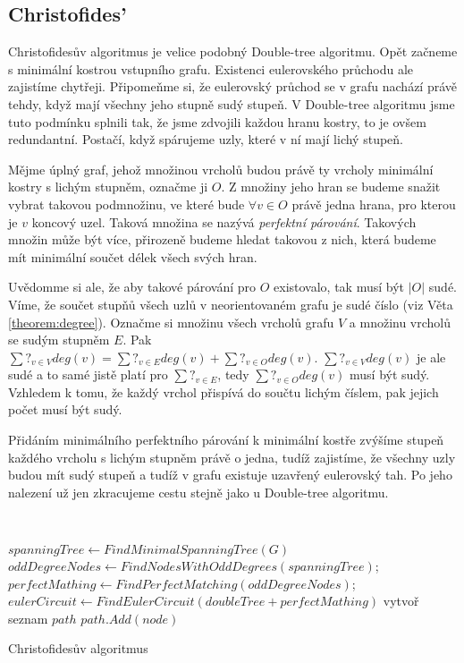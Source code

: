 \documentclass[
  biblatex,
  figures=false,
  glossaries,
  index
]{kidiplom}
\begin{document}
\begin{example}
\end{example}

\subsection{Christofides'}
Christofidesův algoritmus je velice podobný Double-tree algoritmu. Opět začneme s minimální kostrou vstupního grafu. Existenci eulerovského průchodu ale zajistíme chytřeji. Připomeňme si, že eulerovský průchod se v grafu nachází právě tehdy, když mají všechny jeho stupně sudý stupeň. V Double-tree algoritmu jsme tuto podmínku splnili tak, že jsme zdvojili každou hranu kostry, to je ovšem redundantní. Postačí, když spárujeme uzly, které v ní mají lichý stupeň.

Mějme úplný graf, jehož množinou vrcholů budou právě ty vrcholy minimální kostry s lichým stupněm, označme ji $O$. Z množiny jeho hran se budeme snažit vybrat takovou podmnožinu, ve které bude $\forall v \in O$ právě jedna hrana, pro kterou je $v$ koncový uzel. Taková množina se nazývá \textit{perfektní párování}. Takových množin může být více, přirozeně budeme hledat takovou z nich, která budeme mít minimální součet délek všech svých hran.

Uvědomme si ale, že aby takové párování pro $O$ existovalo, tak musí být $|O|$ sudé. Víme, že součet stupňů všech uzlů v neorientovaném grafu je sudé číslo (viz Věta \ref{theorem:degree}). Označme si množinu všech vrcholů grafu $V$ a množinu vrcholů se sudým stupněm $E$. Pak $\sum?_{v \in V} deg(v) = \sum?_{v \in E} deg(v) + \sum?_{v \in O} deg(v)$. $\sum?_{v \in V} deg(v)$ je ale sudé a to samé jistě platí pro $\sum?_{v \in E}$, tedy $\sum?_{v \in O} deg(v)$ musí být sudý. Vzhledem k tomu, že každý vrchol přispívá do součtu lichým číslem, pak jejich počet musí být sudý.

Přidáním minimálního perfektního párování k minimální kostře zvýšíme stupeň každého vrcholu s lichým stupněm právě o jedna, tudíž zajistíme, že všechny uzly budou mít sudý stupeň a tudíž v grafu existuje uzavřený eulerovský tah. Po jeho nalezení už jen zkracujeme cestu stejně jako u Double-tree algoritmu.

{\SetAlgoNoLine\
\begin{algorithm}[H]
$spanningTree \leftarrow FindMinimalSpanningTree(G)$\;
$oddDegreeNodes \leftarrow FindNodesWithOddDegrees(spanningTree)$;
$perfectMathing \leftarrow FindPerfectMatching(oddDegreeNodes)$;
$eulerCircuit \leftarrow FindEulerCircuit(doubleTree + perfectMathing)$\;
vytvoř seznam $path$\;
{
	{
		$path.Add(node)$\;
	}
}
\caption{Christofidesův algoritmus}
\end{algorithm}}\leavevmode\newline
\end{document}
